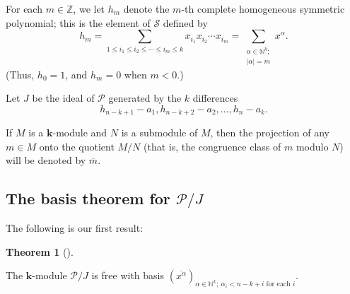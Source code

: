 \documentclass[numbers=enddot,12pt,final,onecolumn,notitlepage]{scrartcl}%
\theoremstyle{definition}
\newtheorem{theo}{Theorem}[section]
\newenvironment{theorem}[1][]
{\begin{theo}[#1]\begin{leftbar}}
{\end{leftbar}\end{theo}}
\let\sumnonlimits\sum
\renewcommand{\sum}{\sumnonlimits\limits}
\begin{document}
For each $m\in\mathbb{Z}$, we let $h_{m}$ denote the $m$-th complete
homogeneous symmetric polynomial; this is the element of $\mathcal{S}$ defined
by%
\begin{equation}
h_{m}=\sum_{1\leq i_{1}\leq i_{2}\leq\cdots\leq i_{m}\leq k}x_{i_{1}}x_{i_{2}%
}\cdots x_{i_{m}}=\sum_{\substack{\alpha\in\mathbb{N}^{k};\\\left\vert
\alpha\right\vert =m}}x^{\alpha}. \label{eq.hm}%
\end{equation}
(Thus, $h_{0}=1$, and $h_{m}=0$ when $m<0$.)

Let $J$ be the ideal of $\mathcal{P}$ generated by the $k$ differences%
\begin{equation}
h_{n-k+1}-a_{1},h_{n-k+2}-a_{2},\ldots,h_{n}-a_{k}. \label{eq.gensJ}%
\end{equation}


If $M$ is a $\mathbf{k}$-module and $N$ is a submodule of $M$, then the
projection of any $m\in M$ onto the quotient $M/N$ (that is, the congruence
class of $m$ modulo $N$) will be denoted by $\overline{m}$.

\subsection{The basis theorem for $\mathcal{P}/J$}

The following is our first result:

\begin{theorem}
\label{thm.P/J}The $\mathbf{k}$-module $\mathcal{P}/J$ is free with basis
$\left(  \overline{x^{\alpha}}\right)  _{\alpha\in\mathbb{N}^{k};\ \alpha
_{i}<n-k+i\text{ for each }i}$.
\end{theorem}
\end{document}
